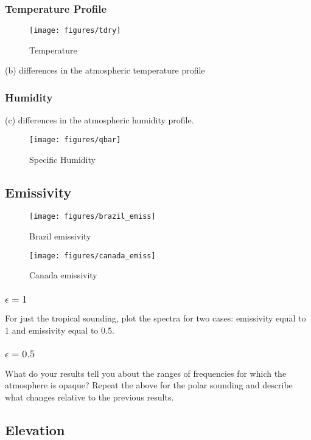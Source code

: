 \documentclass[twocol]{ametsoc}
\begin{document}
\subsubsection{Temperature Profile}


\begin{figure}
	\centering
	\texttt{[image: figures/tdry]}
	\caption{Temperature}
	\label{fig:tdry}
\end{figure}

(b) differences in the atmospheric temperature profile
\subsubsection{Humidity}
(c) differences in the atmospheric humidity profile.

\begin{figure}
	\centering
	\texttt{[image: figures/qbar]}
	\caption{Specific Humidity}
	\label{fig:qbar}
\end{figure}

\subsection{Emissivity}


\begin{figure}
	\centering
	\texttt{[image: figures/brazil\_emiss]}
	\caption{Brazil emissivity}
	\label{fig:bemiss}
\end{figure}


\begin{figure}
	\centering
	\texttt{[image: figures/canada\_emiss]}
	\caption{Canada emissivity}
	\label{fig:cemiss}
\end{figure}

\subsubsection{$\epsilon = 1$}
For just the tropical sounding, plot the spectra for two cases:  emissivity equal to 1  and emissivity equal to 0.5.
\subsubsection{$\epsilon = 0.5$}
What do your results tell you about the ranges of frequencies for which the atmosphere is opaque?
Repeat the above for the polar sounding and describe what changes relative to the previous results.

\subsection{Elevation}
\end{document}
